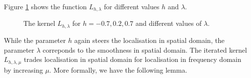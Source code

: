 \documentclass[11pt,a4paper,twoside,bibtotoc]{scrartcl}
\theoremstyle{plain}
\theoremstyle{definition}
\theoremstyle{remark}
\numberwithin{equation}{section}
\numberwithin{table}{section}
\numberwithin{figure}{section}
\begin{document}
Figure \ref{Basics:Figure:LKernel} shows the function $L_{h,\lambda}$ for
different values $h$ and $\lambda$.
\begin{figure}[tb]
  \centering
  \hfill
  \caption{The kernel $L_{h,\lambda}$ for $h = -0.7, 0.2, 0.7$ and different values of $\lambda$.}
  \label{Basics:Figure:LKernel}
\end{figure}
While the parameter $h$ again steers the localisation in spatial domain, the
parameter $\lambda$ correponds to the smoothness in spatial domain.
The iterated kernel $L_{h,\lambda,\mu}$ trades localisation in spatial domain
for localisation in frequency domain by increasing $\mu$.
More formally, we have the following lemma.
\end{document}
